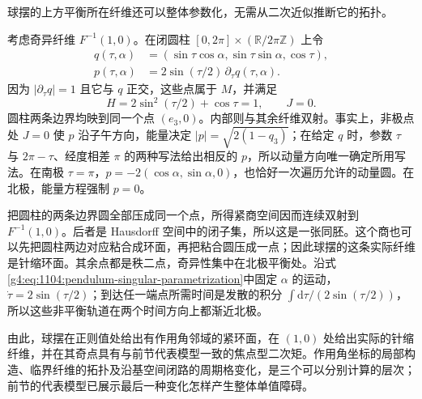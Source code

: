 球摆的上方平衡所在纤维还可以整体参数化，无需从二次近似推断它的拓扑。

\begin{example}\label{g4:exm:1104:pendulum-pinched-torus}
	考虑奇异纤维 \(F^{-1}(1,0)\)。在闭圆柱 \([0,2\pi]\times(\mathbb R/2\pi\mathbb Z)\) 上令
	\begin{equation}\label{g4:eq:1104:pendulum-singular-parametrization}
		\begin{aligned}
			q(\tau,\alpha)&=(\sin\tau\cos\alpha,\sin\tau\sin\alpha,\cos\tau),\\
			p(\tau,\alpha)&=2\sin(\tau/2)\,\partial_\tau q(\tau,\alpha).
		\end{aligned}
	\end{equation}
	因为 \(|\partial_\tau q|=1\) 且它与 \(q\) 正交，这些点属于 \(M\)，并满足
	\[
		H=2\sin^2(\tau/2)+\cos\tau=1,\qquad J=0.
	\]
	圆柱两条边界均映到同一个点 \((e_3,0)\)。内部则与其余纤维双射。事实上，非极点处 \(J=0\) 使 \(p\) 沿子午方向，能量决定 \(|p|=\sqrt{2(1-q_3)}\)；在给定 \(q\) 时，参数 \(\tau\) 与 \(2\pi-\tau\)、经度相差 \(\pi\) 的两种写法给出相反的 \(p\)，所以动量方向唯一确定所用写法。在南极 \(\tau=\pi\)，\(p=-2(\cos\alpha,\sin\alpha,0)\)，也恰好一次遍历允许的动量圆。在北极，能量方程强制 \(p=0\)。

	把圆柱的两条边界圆全部压成同一个点，所得紧商空间因而连续双射到 \(F^{-1}(1,0)\)。后者是 Hausdorff 空间中的闭子集，所以这是一张同胚。这个商也可以先把圆柱两边对应粘合成环面，再把粘合圆压成一点；因此球摆的这条实际纤维是针缩环面。其余点都是秩二点，奇异性集中在北极平衡处。沿式\eqref{g4:eq:1104:pendulum-singular-parametrization}中固定 \(\alpha\) 的运动，\(\dot\tau=2\sin(\tau/2)\)；到达任一端点所需时间是发散的积分 \(\int\mathrm{d}\tau/(2\sin(\tau/2))\)，所以这些非平衡轨道在两个时间方向上都渐近北极。
\end{example}

由此，球摆在正则值处给出有作用角邻域的紧环面，在 \((1,0)\) 处给出实际的针缩纤维，并在其奇点具有与前节代表模型一致的焦点型二次矩。作用角坐标的局部构造、临界纤维的拓扑及沿基空间闭路的周期格变化，是三个可以分别计算的层次；前节的代表模型已展示最后一种变化怎样产生整体单值障碍。
